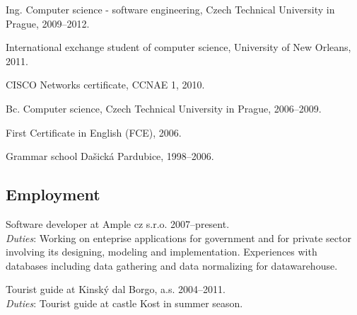 \documentclass[czech]{article}
\renewenvironment{itemize}{
  \begin{list}{}{
    \setlength{\leftmargin}{1.5em}
  }
}{
  \end{list}
}
\begin{document}
\begin{itemize}
	\item Ing. Computer science - software engineering, Czech Technical University
  in Prague, 2009--2012.

  \item International exchange student of computer science, University of New
  Orleans, 2011.
  \item CISCO Networks certificate, CCNAE 1, 2010.
  
  \item Bc. Computer science, Czech Technical University in Prague, 2006--2009.
  \item First Certificate in English (FCE), 2006.
  \item Grammar school Dašická Pardubice, 1998--2006.
\end{itemize}


\textcolor{coolblack}{\section*{Employment}}

\begin{itemize}
\item Software developer at Ample cz s.r.o. 2007--present.\\
\textit{Duties}: Working on enteprise applications for government and for
private sector involving its designing, modeling and implementation. Experiences
with databases including data gathering and data normalizing for datawarehouse.
\item Tourist guide at Kinský dal Borgo, a.s. 2004--2011.\\
\textit{Duties}: Tourist guide at castle Kost in summer season.
\item 
\end{itemize}
\end{document}
